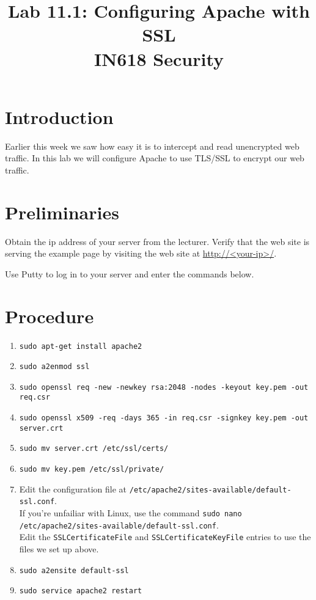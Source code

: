 \documentclass{article}
\begin{document}
\title{ Lab 11.1: Configuring Apache with SSL  \\ IN618 Security}
\maketitle

\section*{Introduction}
Earlier this week we saw how easy it is to intercept and read unencrypted web traffic.  In this lab we will configure Apache to use TLS/SSL to encrypt our web traffic.

\section{Preliminaries}
Obtain the ip address of your server from the lecturer.  Verify that the web site is serving the example page by visiting the web site at \url{http://<your-ip>/}.

Use Putty to log in to your server and enter the commands below.


\section{Procedure}
\begin{enumerate}
	\item \texttt{sudo apt-get install apache2}
	\item \texttt{sudo a2enmod ssl}
	\item \texttt{sudo openssl req -new -newkey rsa:2048 -nodes -keyout key.pem -out req.csr}
	\item \texttt{sudo openssl x509 -req -days 365 -in req.csr -signkey key.pem -out server.crt}
	\item \texttt{sudo mv server.crt /etc/ssl/certs/}
	\item \texttt{sudo mv key.pem /etc/ssl/private/}
	\item  Edit the configuration file at \texttt{/etc/apache2/sites-available/default-ssl.conf}.  \\
	If you're unfailiar with Linux, use the command \texttt{sudo nano /etc/apache2/sites-available/default-ssl.conf}.  \\
	Edit the \texttt{SSLCertificateFile} and \texttt{SSLCertificateKeyFile} entries to use the files we set up above.
	\item \texttt{sudo a2ensite default-ssl}
	\item \texttt{sudo service apache2 restart}
	
	

\end{enumerate}
\end{document}
